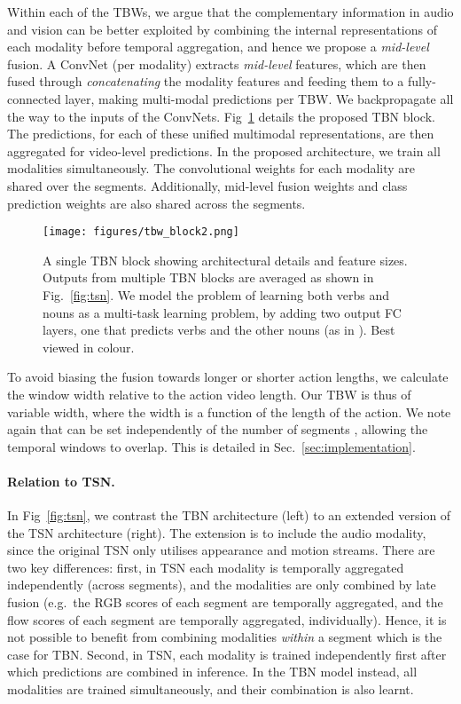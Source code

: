\documentclass[10pt,twocolumn,letterpaper]{article}
\begin{document}
Within each of the  TBWs, we argue that the complementary information in audio and vision can be better exploited by combining the internal representations
of each modality before temporal aggregation, and hence we propose a \textit{mid-level} fusion. A ConvNet (per modality) extracts \textit{mid-level} features, which are then fused 
through
\textit{concatenating} the modality features and feeding them to a fully-connected layer, making multi-modal predictions per TBW. 
We backpropagate all the way to the inputs of the ConvNets.
Fig~\ref{fig:tsn2} details the proposed TBN block.
The predictions, for each of these unified multimodal representations, are then aggregated for video-level predictions.
In the proposed architecture, we train all modalities simultaneously. 
The convolutional weights for each modality are shared over the  segments. 
Additionally, mid-level fusion weights and class prediction weights are also shared across the segments.


 \begin{figure}[t]
	\centering
	\texttt{[image: figures/tbw\_block2.png]}
	\caption{A single TBN block showing architectural details and feature sizes. Outputs from multiple TBN blocks are averaged as shown in Fig.~\ref{fig:tsn}. We model the problem of learning both verbs and nouns as a multi-task learning problem, by adding two output FC layers, one that predicts verbs and the other nouns (as in \cite{Damen_2018_ECCV}). Best viewed in colour.}
	\label{fig:tsn2}
\end{figure} 
To avoid biasing the fusion towards longer or shorter action lengths, we calculate the window width  relative to the action video length.
Our TBW is thus of variable width, where the width is a function of the length of the action. We note again that  can be set independently of the number of segments , allowing the temporal windows to overlap. This is detailed in Sec.~\ref{sec:implementation}. 

\vspace*{-6pt}
\paragraph{Relation to TSN.} In Fig~\ref{fig:tsn}, we contrast the TBN architecture (left) to an extended version of the TSN architecture (right). The extension is to include the audio modality, since the original TSN only utilises appearance and motion streams. There are two key differences: first, in TSN each modality is temporally aggregated independently (across segments), and the modalities are only combined by late fusion (e.g.\ the RGB scores of each segment are temporally aggregated, and the flow scores of each segment are temporally aggregated, individually). Hence, it is not possible to benefit from combining modalities {\em within} a segment which is the case for TBN. Second, in TSN, each modality is trained independently first after which predictions are combined in inference. 
In the TBN model instead, all modalities are trained simultaneously, and their combination is also learnt. 
\end{document}
